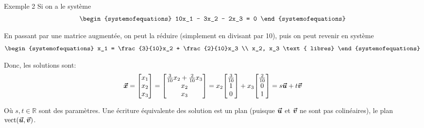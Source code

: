 \documentclass{article}
\begin{document}
\begin{parag}{Exemple 2}
    Si on a le système
    \[\begin{systemofequations}
    10x_1 - 3x_2 - 2x_3 = 0
    \end{systemofequations}\]

    En passant par une matrice augmentée, on peut la réduire (simplement en divisant par 10), puis on peut revenir en système
    \[\begin{systemofequations}
    x_1 = \frac{3}{10}x_2 + \frac{2}{10}x_3 \\
    x_2, x_3 \text{ libres}
    \end{systemofequations}\]

    Donc, les solutions sont:
    \[\bvec{x} = \begin{bmatrix} x_1 \\ x_2 \\ x_3 \end{bmatrix} = \begin{bmatrix} \frac{3}{10}x_2 + \frac{2}{10}x_3 \\ x_2 \\ x_3 \end{bmatrix} = x_2 \begin{bmatrix} \frac{3}{10} \\  1\\  0\end{bmatrix} + x_3 \begin{bmatrix} \frac{2}{10} \\ 0 \\ 1 \end{bmatrix} = s \bvec{u} + t \bvec{v} \]

    Où $s, t \in \mathbb{R}$ sont des paramètres. Une écriture équivalente des solution est un plan (puisque $\bm{\protect\vec{u}}$ et $\bm{\protect\vec{v}}$ ne sont pas colinéaires), le plan $\vect\left(\bvec{u}, \bvec{v}\right)$.
\end{parag}
\end{document}
